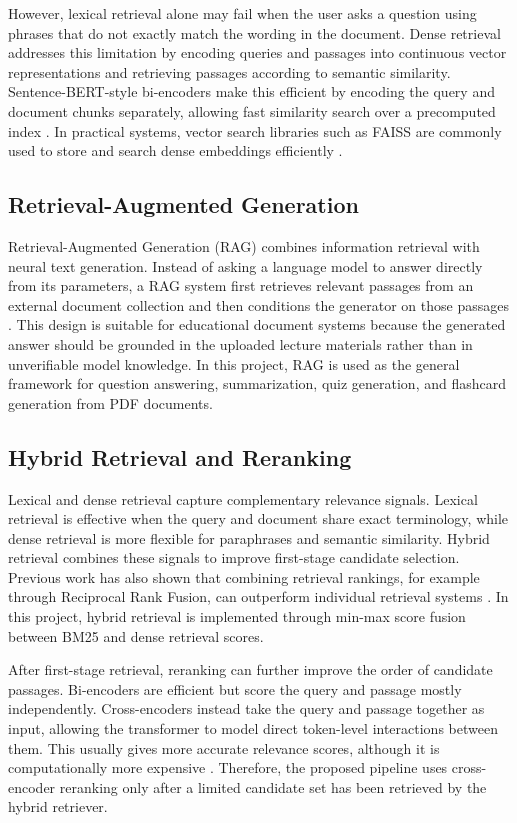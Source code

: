 \documentclass[11pt,a4paper]{article}
\begin{document}
However, lexical retrieval alone may fail when the user asks a question using
phrases that do not exactly match the wording in the document. Dense retrieval
addresses this limitation by encoding queries and passages into continuous
vector representations and retrieving passages according to semantic similarity.
Sentence-BERT-style bi-encoders make this efficient by encoding the query and
document chunks separately, allowing fast similarity search over a precomputed
index \cite{reimers2019sentencebert}. In practical systems, vector search
libraries such as FAISS are commonly used to store and search dense embeddings
efficiently \cite{johnson2019faiss}.

\subsection{Retrieval-Augmented Generation}

Retrieval-Augmented Generation (RAG) combines information retrieval with neural
text generation. Instead of asking a language model to answer directly from its
parameters, a RAG system first retrieves relevant passages from an external
document collection and then conditions the generator on those passages
\cite{lewis2020rag}. This design is suitable for educational document systems
because the generated answer should be grounded in the uploaded lecture
materials rather than in unverifiable model knowledge. In this project, RAG is
used as the general framework for question answering, summarization, quiz
generation, and flashcard generation from PDF documents.

\subsection{Hybrid Retrieval and Reranking}

Lexical and dense retrieval capture complementary relevance signals. Lexical
retrieval is effective when the query and document share exact terminology,
while dense retrieval is more flexible for paraphrases and semantic similarity.
Hybrid retrieval combines these signals to improve first-stage candidate
selection. Previous work has also shown that combining retrieval rankings, for
example through Reciprocal Rank Fusion, can outperform individual retrieval
systems \cite{cormack2009rrf}. In this project, hybrid retrieval is implemented
through min-max score fusion between BM25 and dense retrieval scores.

After first-stage retrieval, reranking can further improve the order of
candidate passages. Bi-encoders are efficient but score the query and passage
mostly independently. Cross-encoders instead take the query and passage together
as input, allowing the transformer to model direct token-level interactions
between them. This usually gives more accurate relevance scores, although it is
computationally more expensive \cite{nogueira2019passage}. Therefore, the
proposed pipeline uses cross-encoder reranking only after a limited candidate
set has been retrieved by the hybrid retriever.
\end{document}
